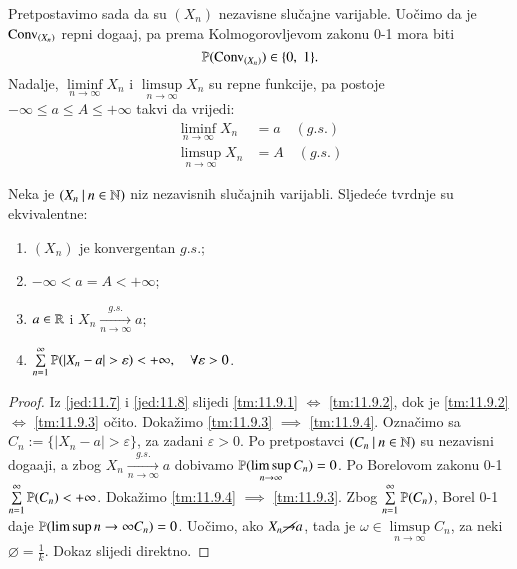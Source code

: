 Pretpostavimo sada da su $(X_n)$ nezavisne slu\v cajne varijable.
Uo\v cimo da je $\mathrm{Conv}_{(X_n)}$ repni doga\dj aj, pa prema Kolmogorovljevom zakonu 0-1 mora biti
\begin{equation}    \label{jed:11.7}
    \mathbb{P}({\mathrm{Conv}_{(X_n)}}) \in \{ 0, \; 1 \}.
\end{equation}
Nadalje, $\liminf\limits_{n \to \infty} X_n$ i $\limsup\limits_{n \to \infty} X_n$ su repne funkcije, pa postoje $- \infty \leq a \leq A \leq +\infty$ takvi da vrijedi:
\begin{equation}    \label{jed:11.8}
    \begin{aligned}
        \liminf\limits_{n \to \infty} X_n &= a \quad (g.s.)\\
        \limsup\limits_{n \to \infty} X_n &= A \quad (g.s.)
    \end{aligned}
\end{equation}

\begin{tm}  \label{tm:11.9}
    Neka je $({X_n} \: | \: {n \in \mathbb{N}})$ niz nezavisnih slu\v cajnih varijabli.
    Sljede\' ce tvrdnje su ekvivalentne:
    \begin{enumerate}[label=(\roman*)]
        \item   \label{tm:11.9.1}
        $(X_n)$ je konvergentan $g.s.$;
        \item   \label{tm:11.9.2}
        $-\infty < a = A < +\infty$;
        \item   \label{tm:11.9.3}
        $a \in \mathbb{R}$ i $X_n \xrightarrow[n \to \infty]{g.s.} a$;
        \item   \label{tm:11.9.4}
        $\sum\limits_{n = 1}^{\infty} \mathbb{P}({|X_n - a| > \varepsilon}) < +\infty, \quad \forall \varepsilon > 0$.
    \end{enumerate}
\end{tm}

\begin{proof}
    Iz \eqref{jed:11.7} i \eqref{jed:11.8} slijedi \ref{tm:11.9.1} $\iff$ \ref{tm:11.9.2}, dok je \ref{tm:11.9.2} $\iff$ \ref{tm:11.9.3} o\v cito.
    Doka\v zimo \ref{tm:11.9.3} $\implies$ \ref{tm:11.9.4}.
    Ozna\v cimo sa $C_n := \{ |X_n - a| > \varepsilon\}$, za zadani $\varepsilon > 0$.
    Po pretpostavci $({C_n} \: | \: {n \in \mathbb{N}})$ su nezavisni doga\dj aji, a zbog $X_n \xrightarrow[n \to \infty]{g.s.} a$ dobivamo $\mathbb{P}({\limsup\limits_{n \to \infty} C_n}) = 0$.
    Po Borelovom zakonu 0-1 $\sum\limits_{n = 1}^{\infty} \mathbb{P}({C_n}) < +\infty$.
    Doka\v zimo \ref{tm:11.9.4} $\implies$ \ref{tm:11.9.3}.
    Zbog $\sum\limits_{n = 1}^{\infty} \mathbb{P}({C_n})$, Borel 0-1 daje $\mathbb{P}({\limsup\limits{n \to \infty} C_n}) = 0$.
    Uo\v cimo, ako $X_n \cancel{\to} a$, tada je $\omega \in \limsup\limits_{n \to \infty} C_n$, za neki $\varnothing = \frac{1}{k}$.
    Dokaz slijedi direktno.
\end{proof}

